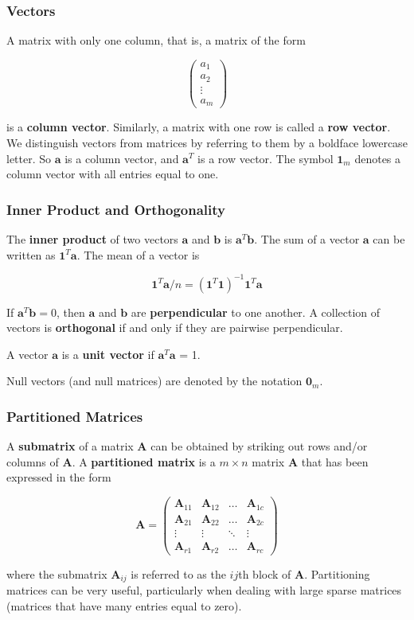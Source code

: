 \documentclass{beamer}
\begin{document}
\begin{frame}
\frametitle{Vectors}
A matrix with only one column, that is, a matrix of the form

\[\begin{pmatrix}
    a_1\\
    a_2\\
    \vdots  \\
    a_m
\end{pmatrix}
\]

is a \textbf{column vector}.  Similarly, a matrix with one row is called a \textbf{row vector}.  We distinguish vectors from matrices by referring to them by a boldface lowercase letter.  So $\mathbf{a}$ is a column vector, and $\mathbf{a}^T$ is a row vector.  The symbol $\mathbf{1}_m$ denotes a column vector with all entries equal to one.\\
\end{frame}

\begin{frame}
\frametitle{Inner Product and Orthogonality}
The \textbf{inner product} of two vectors $\mathbf{a}$ and $\mathbf{b}$ is $\mathbf{a}^T\mathbf{b}$.  The sum of a vector $\mathbf{a}$ can be written as $\mathbf{1}^T\mathbf{a}$.  The mean of a vector is

\[\mathbf{1}^T\mathbf{a}/n = (\mathbf{1}^T\mathbf{1})^{-1}\mathbf{1}^T\mathbf{a}\]

If $\mathbf{a}^T\mathbf{b} = 0$, then $\mathbf{a}$ and $\mathbf{b}$ are \textbf{perpendicular} to one another.  A collection of vectors is \textbf{orthogonal} if and only if they are pairwise perpendicular.
\vspace{5mm}

A vector $\mathbf{a}$ is a \textbf{unit vector} if $\mathbf{a}^T\mathbf{a}$ = 1.
\vspace{5mm}

Null vectors (and null matrices) are denoted by the notation $\mathbf{0}_m$.
\end{frame}

\begin{frame}
\frametitle{Partitioned Matrices}
A \textbf{submatrix} of a matrix $\mathbf{A}$ can be obtained by striking out rows and/or columns of $\mathbf{A}$.  A \textbf{partitioned matrix} is a $m \times n$ matrix $\mathbf{A}$ that has been expressed in the form 

\[\mathbf{A} = 
\begin{pmatrix}
    \mathbf{A}_{11} & \mathbf{A}_{12} & \dots  & \mathbf{A}_{1c} \\
    \mathbf{A}_{21} & \mathbf{A}_{22}  & \dots  & \mathbf{A}_{2c} \\
    \vdots & \vdots  & \ddots & \vdots \\
    \mathbf{A}_{r1} & \mathbf{A}_{r2}  & \dots  & \mathbf{A}_{rc}
\end{pmatrix}
\]

where the submatrix $\mathbf{A}_{ij}$ is referred to as the $ij$th block of $\mathbf{A}$.  Partitioning matrices can be very useful, particularly when dealing with large sparse matrices (matrices that have many entries equal to zero).
\end{frame}
\end{document}
